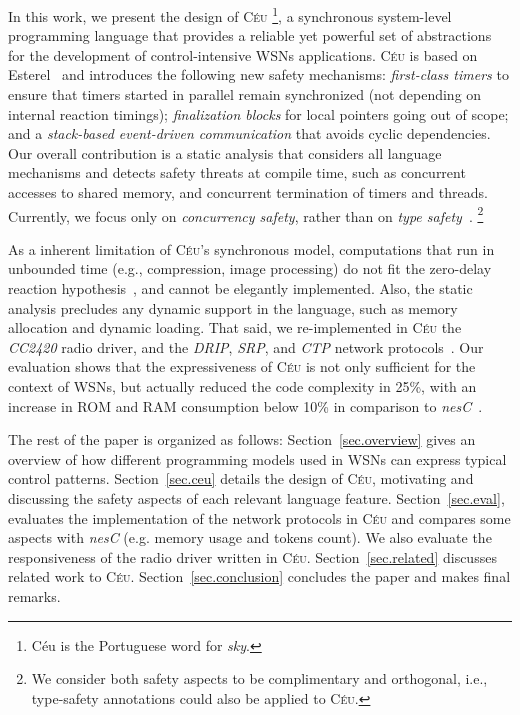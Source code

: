 \documentclass[10pt]{sensys-proc}
\newcommand{\CEU}{\textsc{C\'{e}u}\xspace}
\begin{document}
In this work, we present the design of \CEU%
\footnote{C\'eu is the Portuguese word for \emph{sky}.},
a synchronous system-level programming language that provides a reliable yet 
powerful set of abstractions for the development of control-intensive WSNs 
applications.
%
\CEU is based on Esterel~\cite{esterel.ieee91} and introduces the following new 
safety mechanisms:
\emph{first-class timers} to ensure that timers started in parallel remain 
synchronized (not depending on internal reaction timings);
\emph{finalization blocks} for local pointers going out of scope;
and a \emph{stack-based event-driven communication} that avoids cyclic 
dependencies.
%
Our overall contribution is a static analysis that considers all language 
mechanisms and detects safety threats at compile time, such as concurrent 
accesses to shared memory, and concurrent termination of timers and threads.
%
Currently, we focus only on \emph{concurrency safety}, rather than on 
\emph{type safety}~\cite{wsn.safety}.%
\footnote{
We consider both safety aspects to be complimentary and orthogonal, i.e., 
type-safety annotations could also be applied to \CEU.
}

As a inherent limitation of \CEU's synchronous model, computations that run in 
unbounded time (e.g., compression, image processing) do not fit the zero-delay 
reaction hypothesis~\cite{rp.hypothesis}, and cannot be elegantly implemented.
%
Also, the static analysis precludes any dynamic support in the language, such 
as memory allocation and dynamic loading.
%
That said, we re-implemented in \CEU the \emph{CC2420} radio driver, and the 
\emph{DRIP}, \emph{SRP}, and \emph{CTP} network protocols~\cite{wsn.teps}.
Our evaluation shows that the expressiveness of \CEU is not only sufficient for 
the context of WSNs, but actually reduced the code complexity in 25\%, with an 
increase in ROM and RAM consumption below 10\% in comparison to 
\emph{nesC}~\cite{wsn.nesc}.

The rest of the paper is organized as follows:
Section~\ref{sec.overview} gives an overview of how different programming 
models used in WSNs can express typical control patterns.
Section~\ref{sec.ceu} details the design of \CEU, motivating and discussing the
safety aspects of each relevant language feature.
Section~\ref{sec.eval}, evaluates the implementation of the network protocols 
in \CEU and compares some aspects with \emph{nesC} (e.g. memory usage and 
tokens count).
We also evaluate the responsiveness of the radio driver written in \CEU.
Section~\ref{sec.related} discusses related work to \CEU.
Section~\ref{sec.conclusion} concludes the paper and makes final remarks.
\end{document}
